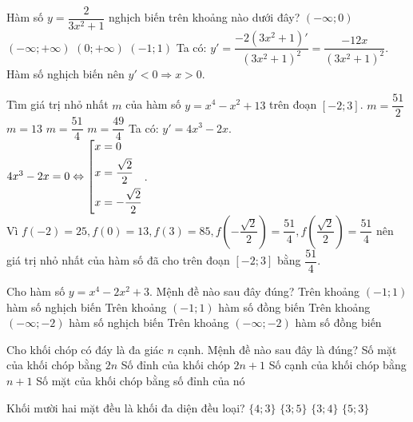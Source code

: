 \begin{ex}%
Hàm số $y = \dfrac{2}{3x^2+1}$ nghịch biến trên khoảng nào dưới đây?
 \choice
  { $\left(-\infty; 0\right)$}
  { $\left(-\infty; +\infty \right)$}
  { \True $\left(0; +\infty \right)$}
  { $\left(-1; 1\right)$}
 \loigiai
  {
  Ta có: $y' = \dfrac{-2(3x^2+1)' }{(3x^2+1)^2} = \dfrac{-12x}{(3x^2+1)^2}.$
  Hàm số nghịch biến nên $y' < 0 \Rightarrow x >0$.
  }
\end{ex}


\begin{ex}%
Tìm giá trị nhỏ nhất $m$ của hàm số $y = x^4-x^2+13$ trên đoạn $\left[-2; 3\right]$.
 \choice
  { $m = \dfrac{51}{2}$}
  { $m = 13$}
  { \True $m = \dfrac{51}{4}$}
  { $m = \dfrac{49}{4}$}
 \loigiai
  {
  Ta có: $y' = 4x^3-2x$.\\
  $4x^3 - 2x =0 \Leftrightarrow \left[\begin{aligned}& x=0 \\& x=\dfrac{\sqrt{2}}{2} \\& x= -\dfrac{\sqrt{2}}{2}\end{aligned}\right.$.\\
  Vì $f(-2)= 25, f(0)= 13, f(3)= 85, f\left(-\dfrac{\sqrt{2}}{2}\right)= \dfrac{51}{4}, f\left(\dfrac{\sqrt{2}}{2}\right)= \dfrac{51}{4}$ nên giá trị nhỏ nhất của hàm số đã cho trên đoạn $\left[-2; 3\right]$ bằng $\dfrac{51}{4}$.
  }
\end{ex}


\begin{ex}%
Cho hàm số $y = x^4-2x^2+3$. Mệnh đề nào sau đây đúng?
 \choice
  { Trên khoảng $(-1;1)$ hàm số nghịch biến}
  { Trên khoảng $(-1;1)$ hàm số đồng biến}
  { \True Trên khoảng $(-\infty;-2)$ hàm số nghịch biến}
  { Trên khoảng $(-\infty;-2)$ hàm số đồng biến}
  {
  
  }
\end{ex}


\begin{ex}%
Cho khối chóp có đáy là đa giác $n$ cạnh. Mệnh đề nào sau đây là đúng? 
 \choice
  { Số mặt của khối chóp bằng $2n$}
  { Số đỉnh của khối chóp $2n+1$}
  { Số cạnh của khối chóp bằng $n+1$}
  { \True Số mặt của khối chóp bằng số đỉnh của nó}
  {
  
  }
\end{ex}


\begin{ex}%
Khối mười hai mặt đều là khối đa diện đều loại?
 \choice
  { $\{4; 3\}$}
  { $\{3; 5\}$}
  { $\{3; 4\}$}
  { \True $\{5; 3\}$}
  {
  
  }
\end{ex}


